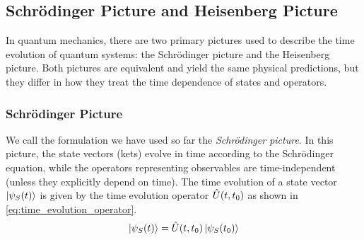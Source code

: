 \subsection{Schrödinger Picture and Heisenberg Picture} 
In quantum mechanics, there are two primary pictures used to describe the time evolution of quantum systems: the Schrödinger picture and the Heisenberg picture. Both pictures are equivalent and yield the same physical predictions, but they differ in how they treat the time dependence of states and operators.
\subsubsection{Schrödinger Picture}
We call the formulation we have used so far the \emph{Schrödinger picture}. In this picture, the state vectors (kets) evolve in time according to the Schrödinger equation, while the operators representing observables are time-independent (unless they explicitly depend on time). The time evolution of a state vector $\ket{\psi_S(t)}$ is given by the time evolution operator $\hat{U}(t,t_0)$ as shown in \cref{eq:time_evolution_operator}.
\begin{align}
    \ket{\psi_S(t)} = \hat{U}(t,t_0) \ket{\psi_S(t_0)}
\end{align}
